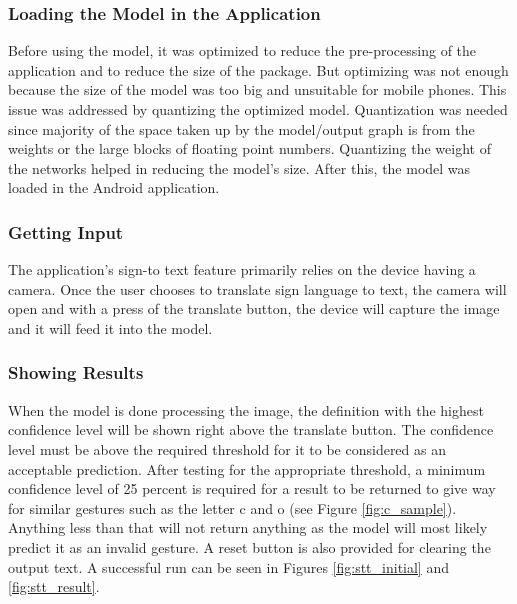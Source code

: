 \documentclass[journal]{./IEEE/IEEEtran}
\begin{document}
\subsubsection{Loading the Model in the Application}
Before using the model, it was optimized to reduce the pre-processing of the application and to reduce the size of the package. But optimizing was not enough because the size of the model was too big and unsuitable for mobile phones. This issue was addressed by quantizing the optimized model.
\newline
\indent Quantization was needed since majority of the space taken up by the model/output graph is from the weights or the large blocks of floating point numbers. Quantizing the weight of the networks helped in reducing the model's size. After this, the model was loaded in the Android application.
\newline
\subsubsection{Getting Input}
The application's sign-to text feature primarily relies on the device having a camera. Once the user chooses to translate sign language to text, the camera will open and with a press of the translate button, the device will capture the image and it will feed it into the model.
\newline
\subsubsection{Showing Results}
When the model is done processing the image, the definition with the highest confidence level will be shown right above the translate button. The confidence level must be above the required threshold for it to be considered as an acceptable prediction.
\newline
\indent After testing for the appropriate threshold, a minimum confidence level of 25 percent is required for a result to be returned to give way for similar gestures such as the letter c and o (see Figure \ref{fig:c_sample}). Anything less than that will not return anything as the model will most likely predict it as an invalid gesture. A reset button is also provided for clearing the output text. A successful run can be seen in Figures \ref{fig:stt_initial} and \ref{fig:stt_result}.
\end{document}
